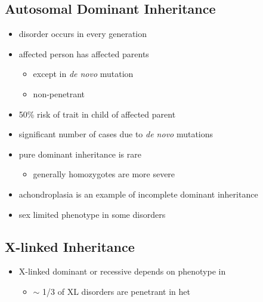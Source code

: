 \documentclass[12pt]{scrartcl}
\begin{document}
\subsection{Autosomal Dominant Inheritance}
\label{sec:org87ded31}
\begin{itemize}
\item disorder occurs in every generation
\item affected person has affected parents
\begin{itemize}
\item except in \emph{de novo} mutation
\item non-penetrant
\end{itemize}
\item 50\% risk of trait in child of affected parent
\item significant number of cases due to \emph{de novo} mutations

\item pure dominant inheritance is rare
\begin{itemize}
\item generally homozygotes are more severe
\end{itemize}
\item achondroplasia is an example of incomplete dominant inheritance
\item sex limited phenotype in some disorders
\end{itemize}

\subsection{X-linked Inheritance}
\label{sec:org51ec55f}
\begin{itemize}
\item X-linked dominant or recessive depends on phenotype in \female
\begin{itemize}
\item \(\sim\) 1/3 of XL disorders are penetrant in het \female
\end{itemize}
\end{itemize}
\end{document}
